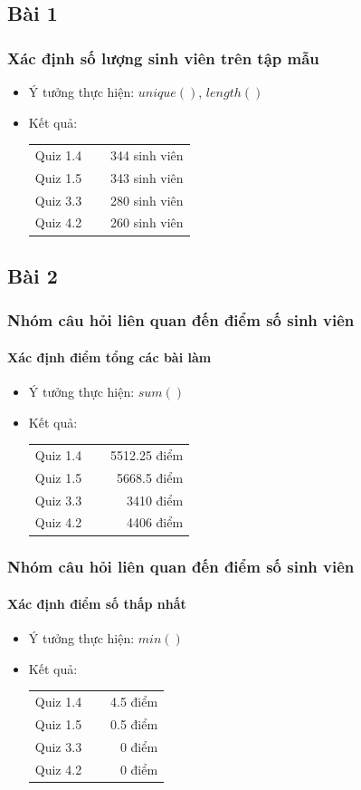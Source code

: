 \documentclass[english,10pt,table]{beamer}
\begin{document}
\subsection{Bài 1}
\frame
{
\frametitle{Xác định số lượng sinh viên trên tập mẫu}
\begin{itemize}
    \item Ý tưởng thực hiện: $unique()$, $length()$
    \item Kết quả:\\
    \begin{center}
        \begin{tabular}{l l l}
             Quiz 1.4 & $\;$ & 344 sinh viên\\
             Quiz 1.5 & $\;$ & 343 sinh viên\\
             Quiz 3.3 & $\;$ & 280 sinh viên\\
             Quiz 4.2 & $\;$ & 260 sinh viên
        \end{tabular}
    \end{center}
\end{itemize}
}

\subsection{Bài 2}
\frame
{
\frametitle{Nhóm câu hỏi liên quan đến điểm số sinh viên}
\framesubtitle{Xác định điểm tổng các bài làm}
\begin{itemize}
    \item Ý tưởng thực hiện: $sum()$
    \item Kết quả:\\
    \begin{center}
        \begin{tabular}{l l r}
             Quiz 1.4 & $\;$ & 5512.25 điểm\\
             Quiz 1.5 & $\;$ & 5668.5 điểm\\
             Quiz 3.3 & $\;$ & 3410 điểm\\
             Quiz 4.2 & $\;$ & 4406 điểm
        \end{tabular}
    \end{center}
\end{itemize}
}

\frame
{
\frametitle{Nhóm câu hỏi liên quan đến điểm số sinh viên}
\framesubtitle{Xác định điểm số thấp nhất}
\begin{itemize}
    \item Ý tưởng thực hiện: $min()$
    \item Kết quả:\\
    \begin{center}
        \begin{tabular}{l l r}
             Quiz 1.4 & $\;$ & 4.5 điểm\\
             Quiz 1.5 & $\;$ & 0.5 điểm\\
             Quiz 3.3 & $\;$ & 0 điểm\\
             Quiz 4.2 & $\;$ & 0 điểm
        \end{tabular}
    \end{center}
\end{itemize}
}
\end{document}
